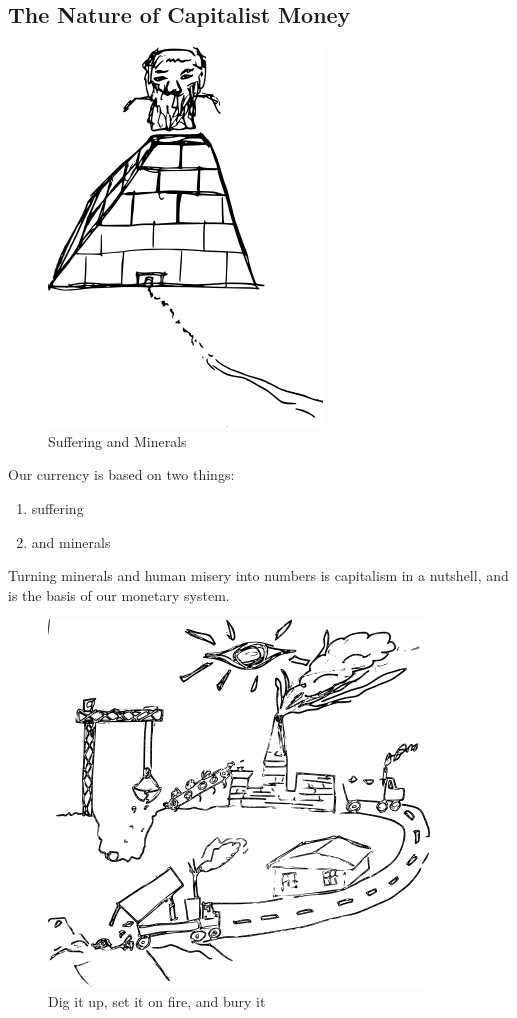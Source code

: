 \subsection{The Nature of Capitalist
Money}\label{the-nature-of-capitalist-money}

\begin{figure}[htbp]
\centering
\includegraphics{images/capitalpyramid.png}
\caption{Suffering and Minerals}
\end{figure}

Our currency is based on two things:

\begin{enumerate}
\def\labelenumi{\arabic{enumi}.}
\item
  suffering
\item
  and minerals
\end{enumerate}

Turning minerals and human misery into numbers is capitalism in a
nutshell, and is the basis of our monetary system.

\begin{figure}[htbp]
\centering
\includegraphics{images/digitup.png}
\caption{Dig it up, set it on fire, and bury it}
\end{figure}

